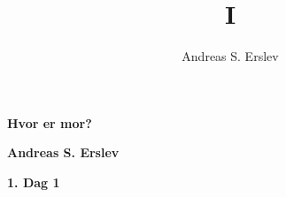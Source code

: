 \documentclass[]{article}
\title{I}
\author{Andreas S. Erslev}
\begin{document}
\begin{center}
	\Large\textbf{Hvor er mor?}
\end{center}

\begin{center}
	\large\textbf{Andreas S. Erslev}
\end{center}

\begin{center}
	\large\textbf{1. Dag 1}
\end{center}
\end{document}
